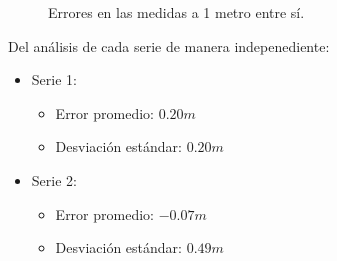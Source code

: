 \documentclass[spanish,12pt,a4paper,titlepage]{report}
\begin{document}
\begin{figure}[H]
\hspace{-50pt}
  \caption{Errores en las medidas a 1 metro entre sí.}
\label{fig:1-metro-err}
\end{figure}

Del análisis de cada serie de manera indepenediente:
\begin{itemize}
\item Serie 1:
		\begin{itemize}
		\item Error promedio: $0.20m$
		\item Desviación estándar: $0.20m$
		\end{itemize}
\item Serie 2:
		\begin{itemize}
		\item Error promedio: $-0.07m$
		\item Desviación estándar: $0.49m$
		\end{itemize}
\end{itemize}
\end{document}
